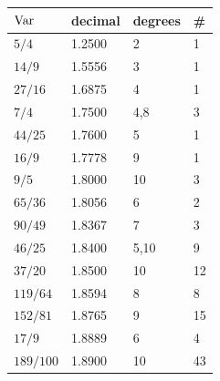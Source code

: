 \begin{tabular}{llll}
\toprule
$\operatorname{Var}$ & decimal & degrees & \#\\
\midrule
$5/4$ & 1.2500 & 2 & 1\\
$14/9$ & 1.5556 & 3 & 1\\
$27/16$ & 1.6875 & 4 & 1\\
$7/4$ & 1.7500 & 4,8 & 3\\
$44/25$ & 1.7600 & 5 & 1\\
$16/9$ & 1.7778 & 9 & 1\\
$9/5$ & 1.8000 & 10 & 3\\
$65/36$ & 1.8056 & 6 & 2\\
$90/49$ & 1.8367 & 7 & 3\\
$46/25$ & 1.8400 & 5,10 & 9\\
$37/20$ & 1.8500 & 10 & 12\\
$119/64$ & 1.8594 & 8 & 8\\
$152/81$ & 1.8765 & 9 & 15\\
$17/9$ & 1.8889 & 6 & 4\\
$189/100$ & 1.8900 & 10 & 43\\
\bottomrule
\end{tabular}
